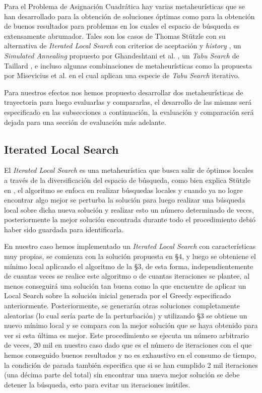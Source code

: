 \documentclass{ci5652}
\begin{document}
Para el Problema de Asignación Cuadrática hay varias metaheurísticas que se han desarrollado para la obtención de soluciones óptimas como para la obtención de buenos resultados para problemas en los cuales el espacio de búsqueda es extensamente abrumador. Tales son los casos de Thomas Stützle con su alternativa de \textit{Iterated Local Search} con criterios de aceptación y \textit{history} \cite{stutzle1999}, un \textit{Simulated Annealing} propuesto por Ghandeshtani et al. \cite{ghandeshtani2010}, un \textit{Tabu Search} de Taillard \cite{taillard1991}, e incluso algunas combinaciones de metaheurísticas como la propuesta por Misevicius et al. \cite{misevicius2006} en el cual aplican una especie de \textit{Tabu Search} iterativo. 

Para nuestros efectos nos hemos propuesto desarrollar dos metaheurísticas de trayectoria para luego evaluarlas y compararlas, el desarrollo de las mismas será especificado en las subsecciones a continuación, la evaluación y comparación será dejada para una sección de evaluación más adelante.

\subsection{Iterated Local Search}

El \textit{Iterated Local Search} es una metaheurística que busca salir de óptimos locales a través de la diversificación del espacio de búsqueda, como bien explica Stützle en \cite{stutzle1999}, el algoritmo se enfoca en realizar búsquedas locales y cuando ya no logre encontrar algo mejor se perturba la solución para luego realizar una búsqueda local sobre dicha nueva solución y realizar esto un número determinado de veces, posteriormente la mejor solución encontrada durante todo el procedimiento debió haber sido guardada para identificarla.

En nuestro caso hemos implementado un \textit{Iterated Local Search} con características muy propias, se comienza con la solución propuesta en §4, y luego se obteniene el mínimo local aplicando el algoritmo de la §3, de esta forma, independientemente de cuantas veces se realice este algoritmo o de cuantas iteraciones se plantee, al menos conseguirá una solución tan buena como la que encuentre de aplicar un Local Search sobre la solución inicial generada por el Greedy especificado anteriormente. Posteriormente, se generarán otras soluciones completamente aleatorias (lo cual sería parte de la perturbación) y utilizando §3 se obtiene un nuevo mínimo local y se compara con la mejor solución que se haya obtenido para ver si esta última es mejor. Este procedimiento se ejecuta un número arbitrario de veces, 20 mil en nuestro caso dado que es el número de iteraciones con el que hemos conseguido buenos resultados y no es exhaustivo en el consumo de tiempo, la condición de parada también especifica que si se han cumplido 2 mil iteraciones (una décima parte del total) sin encontrar una nueva mejor solución se debe detener la búsqueda, esto para evitar un iteraciones inútiles.
\end{document}
